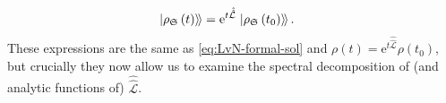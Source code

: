 \documentclass[preprints,article,accept,moreauthors,pdftex]{Definitions/mdpi}
\begin{document}
\begin{paracol}{2}
\begin{subequations}
\begin{align}
        \label{eq:GKSL-vec-sol-time-ind}
        \left.\ket{\rho_\mathfrak{S}\left(t\right)}\!\right\rangle &= \mathrm{e}^{t\hat{\hat{\mathcal{L}}}} \left.\ket{\rho_\mathfrak{S}\left(t_{0}\right)}\!\right\rangle.
    \end{align}
\end{subequations}
These expressions are the same as \eqref{eq:LvN-formal-sol} and $\rho\left(t\right) = \mathrm{e}^{t\hat{\hat{\mathcal{L}}}}\rho\left(t_{0}\right)$, but crucially they now allow us to examine the spectral decomposition of (and analytic functions of) $\hat{\hat{\mathcal{L}}}$.

\end{paracol}



%
\end{document}
